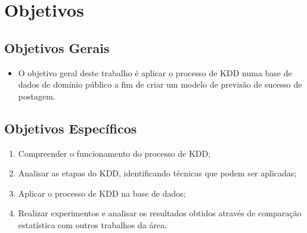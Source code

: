 \section{Objetivos}

\subsection{Objetivos Gerais}
\begin{frame}
	\begin{itemize}
		\item O objetivo geral deste trabalho é aplicar o processo de KDD numa base de dados de domínio público a fim de criar um modelo de previsão de sucesso de postagem.
	\end{itemize}
\end{frame}

\subsection{Objetivos Específicos}
\begin{frame}
	\begin{enumerate}
		\item Compreender o funcionamento do processo de KDD;
		\item Analisar as etapas do KDD, identificando técnicas que podem ser aplicadas;
		\item Aplicar o processo de KDD na base de dados;
		\item Realizar experimentos e analisar os resultados obtidos através de comparação estatística com outros trabalhos da área.
	\end{enumerate}
\end{frame}